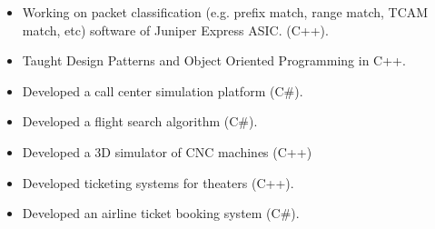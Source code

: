 \begin{itemize}
	\item Working on packet classification (e.g. prefix match, range match, TCAM match, etc) software of Juniper Express ASIC. (C++).
\end{itemize}

\divider

\begin{itemize}
	\item Taught Design Patterns and Object Oriented Programming in C++.
\end{itemize}

\divider

\begin{itemize}
	\item Developed a call center simulation platform (C\#).
\end{itemize}

\divider

\begin{itemize}
	\item Developed a flight search algorithm (C\#).
\end{itemize}

\divider

\begin{itemize}
\item Developed a 3D simulator of CNC machines (C++)
\end{itemize}

\divider

\begin{itemize}
	\item Developed ticketing systems for theaters (C++).
\end{itemize}

\divider

\begin{itemize}
	\item Developed an airline ticket booking system (C\#).
\end{itemize}


